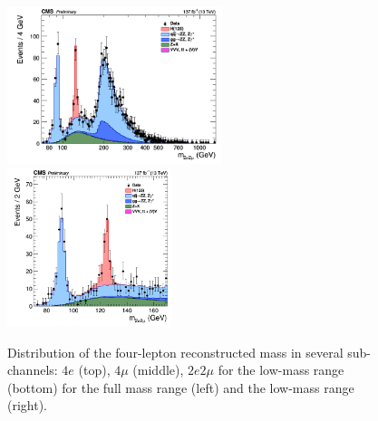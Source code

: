 {\begin{figure}[!htb]
\begin{center}
		\includegraphics[width=0.56\textwidth]{Figures/KinDistr/M4lMain_Unblinded_2e2mu_InclusiveRun2.png}
		\includegraphics[width=0.43\textwidth]{Figures/KinDistr/M4lMainZoomed_Unblinded_2e2mu_InclusiveRun2.png}\\
		\caption{ Distribution of the four-lepton reconstructed mass in several sub-channels: $4e$ (top), $4\mu$ (middle), $2e2\mu$ for the low-mass range (bottom) for the full mass range (left) and the low-mass range (right).
			\label{fig:Mass4l-2C}}
	\end{center}
\end{figure}

}

